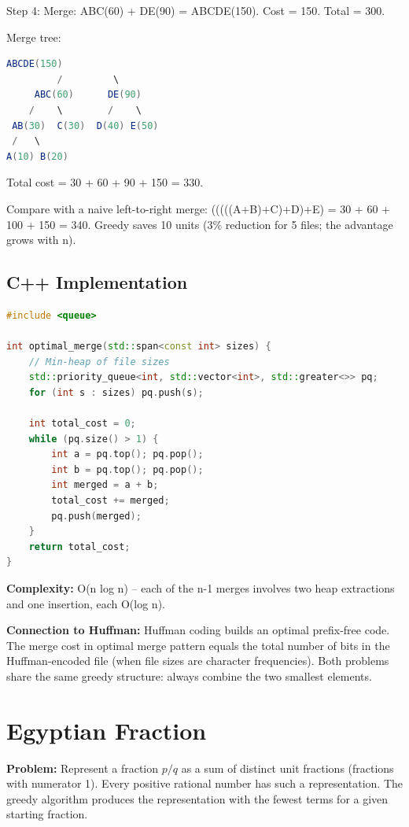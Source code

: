 Step 4: Merge: ABC(60) + DE(90) = ABCDE(150). Cost = 150. Total = 300.

Merge tree:
\begin{lstlisting}[language=Java]
          ABCDE(150)
         /         \
     ABC(60)      DE(90)
    /    \        /    \
 AB(30)  C(30)  D(40) E(50)
 /   \
A(10) B(20)
\end{lstlisting}

Total cost = 30 + 60 + 90 + 150 = 330.

Compare with a naive left-to-right merge:
(((((A+B)+C)+D)+E) = 30 + 60 + 100 + 150 = 340.
Greedy saves 10 units (3\% reduction for 5 files; the advantage grows with n).

\subsection{C++ Implementation}

\begin{lstlisting}[language=C++]
#include <queue>

int optimal_merge(std::span<const int> sizes) {
    // Min-heap of file sizes
    std::priority_queue<int, std::vector<int>, std::greater<>> pq;
    for (int s : sizes) pq.push(s);

    int total_cost = 0;
    while (pq.size() > 1) {
        int a = pq.top(); pq.pop();
        int b = pq.top(); pq.pop();
        int merged = a + b;
        total_cost += merged;
        pq.push(merged);
    }
    return total_cost;
}
\end{lstlisting}

\textbf{Complexity:} O(n log n) -- each of the n-1 merges involves two heap extractions and one insertion, each O(log n).

\textbf{Connection to Huffman:} Huffman coding builds an optimal prefix-free code. The merge cost in optimal merge pattern equals the total number of bits in the Huffman-encoded file (when file sizes are character frequencies). Both problems share the same greedy structure: always combine the two smallest elements.

\section{Egyptian Fraction}

\textbf{Problem:} Represent a fraction $p/q$ as a sum of distinct unit fractions (fractions with numerator 1). Every positive rational number has such a representation. The greedy algorithm produces the representation with the fewest terms for a given starting fraction.

